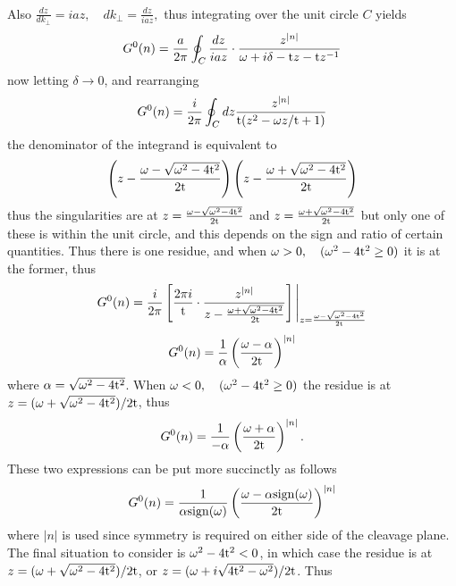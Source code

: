 \documentclass[a4paper, 12pt]{article}
\begin{document}
\\Also $\frac{dz}{dk_\perp}=iaz , \quad dk_\perp =\frac{dz}{iaz},$ thus integrating over the unit circle $C$ yields
\begin{equation}
	G^0 (n) = \frac{a}{2\pi}\oint_C \frac{dz}{iaz}\cdot \frac{z^{|n|}}{\omega +i\delta - {\rm t}z-{\rm t}z^{-1}} 
\end{equation}
now letting $\delta \longrightarrow 0$, and rearranging
\begin{equation}
	G^0 (n) = \frac{i}{2\pi}\oint_C dz\frac{z^{|n|}}{{\rm t}(z^2 -\omega z/{\rm t}+1)} 
\end{equation}
the denominator of the integrand is equivalent to
\begin{equation}
	\left(z-\frac{\omega-\sqrt{\omega^2 -4{\rm t}^2}}{2{\rm t}} \right)\left(z-\frac{\omega+\sqrt{\omega^2 -4{\rm t}^2}}{2{\rm t}} \right)
\end{equation}
thus the singularities are at $z=\frac{\omega-\sqrt{\omega^2 -4{\rm t}^2}}{2{\rm t}}$ and $z=\frac{\omega+\sqrt{\omega^2 -4{\rm t}^2}}{2{\rm t}}$ but only one of these is within the unit circle, and this depends on the sign and ratio of certain quantities. Thus there is one residue, and when $\omega > 0, \quad (\omega^2 -4{\rm t}^2 \geq 0)$ it is at the former, thus
\begin{equation}
	G^0 (n) = \frac{i}{2\pi}\left[\frac{2\pi i}{\rm t} \cdot \frac{z^{|n|}}{z-\frac{\omega+\sqrt{\omega^2 -4{\rm t}^2}}{2{\rm t}}}\right]\Bigg|_{z = \frac{\omega-\sqrt{\omega^2-4{\rm t}^2}}{2{\rm t}}}
\end{equation}
\begin{equation}
G^0 (n) = \frac{1}{\alpha}\left( \frac{\omega-\alpha}{2\rm t}\right)^{|n|} 
\end{equation}
where $ \alpha = \sqrt{\omega^2-4{\rm t}^2} $.
When $\omega < 0, \quad (\omega^2 -4{\rm t}^2 \geq 0)$ the residue is at $z=(\omega+\sqrt{\omega^2 -4{\rm t}^2})/2\rm t$, thus
\begin{equation}
G^0 (n) = \frac{1}{-\alpha}\left( \frac{\omega+\alpha}{2\rm t}\right)^{|n|}  .
\end{equation}
These two expressions can be put more succinctly as follows
\begin{equation}
	G^0 (n) = \frac{1}{\alpha \rm{sign}(\omega)}\left( \frac{\omega-\alpha \rm{sign}(\omega)}{2\rm t}\right)^{|n|}\label{alpha}
\end{equation}
where $|n|$ is used since symmetry is required on either side of the cleavage plane.
The final situation to consider is $\omega^2 -4{\rm t}^2 < 0$, in which case the residue is at $z=(\omega+\sqrt{\omega^2 -4{\rm t}^2})/2\rm t$, or $z=(\omega +i\sqrt{4{\rm t}^2-\omega^2})/2\rm t$. Thus
\end{document}
